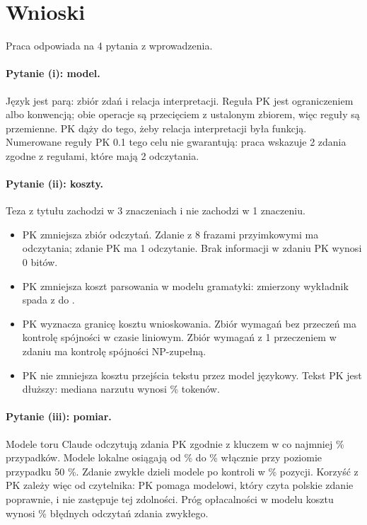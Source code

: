 \section{Wnioski}
\label{sec:conclusions}

Praca odpowiada na 4 pytania z wprowadzenia.

\paragraph{Pytanie (i): model.}
Język jest parą: zbiór zdań i relacja interpretacji. Reguła PK jest ograniczeniem albo
konwencją; obie operacje są przecięciem z ustalonym zbiorem, więc reguły są przemienne.
PK dąży do tego, żeby relacja interpretacji była funkcją. Numerowane reguły PK 0.1 tego
celu nie gwarantują: praca wskazuje 2 zdania zgodne z regułami, które mają 2 odczytania.

\paragraph{Pytanie (ii): koszty.}
Teza z tytułu zachodzi w 3 znaczeniach i nie zachodzi w 1 znaczeniu.
\begin{itemize}[leftmargin=1.6em,itemsep=1pt]
  \item PK zmniejsza zbiór odczytań. Zdanie z 8 frazami przyimkowymi ma \pkAttachEight{}
  odczytania; zdanie PK ma 1 odczytanie. Brak informacji w zdaniu PK wynosi 0 bitów.
  \item PK zmniejsza koszt parsowania w modelu gramatyki: zmierzony wykładnik spada
  z \pkParseExpNat{} do \pkParseExpPk.
  \item PK wyznacza granicę kosztu wnioskowania. Zbiór wymagań bez przeczeń ma kontrolę
  spójności w czasie liniowym. Zbiór wymagań z 1 przeczeniem w zdaniu ma kontrolę spójności
  NP-zupełną.
  \item PK nie zmniejsza kosztu przejścia tekstu przez model językowy. Tekst PK jest
  dłuższy: mediana narzutu wynosi \pkTokMedian{} \% tokenów.
\end{itemize}

\paragraph{Pytanie (iii): pomiar.}
Modele toru Claude odczytują zdania PK zgodnie z kluczem w co najmniej
\pkAccPkClaudeMin{} \% przypadków. Modele lokalne osiągają od \pkAccPkLocalMin{} \%
do \pkAccPkLocalMax{} \% włącznie przy poziomie przypadku 50 \%. Zdanie zwykłe dzieli
modele po kontroli w \pkNatSplit{} \% pozycji. Korzyść z PK zależy więc od czytelnika:
PK pomaga modelowi, który czyta polskie zdanie poprawnie, i nie zastępuje tej zdolności.
Próg opłacalności w modelu kosztu wynosi \pkBreakEvenStar{} \% błędnych odczytań zdania
zwykłego.

